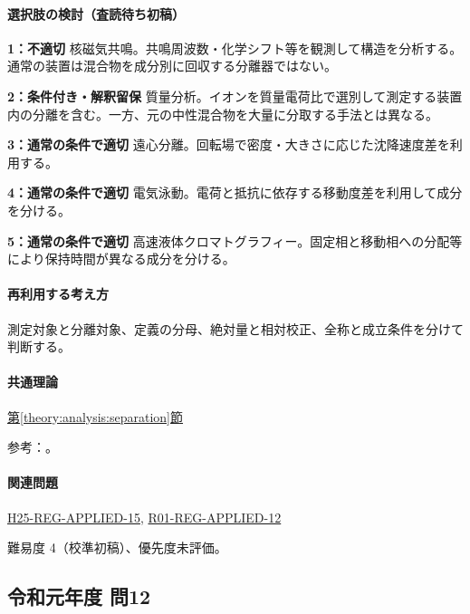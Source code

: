 \paragraph{選択肢の検討（査読待ち初稿）}\mbox{}\par

\noindent\textbf{1：不適切} 核磁気共鳴。共鳴周波数・化学シフト等を観測して構造を分析する。通常の装置は混合物を成分別に回収する分離器ではない。\par

\noindent\textbf{2：条件付き・解釈留保} 質量分析。イオンを質量電荷比で選別して測定する装置内の分離を含む。一方、元の中性混合物を大量に分取する手法とは異なる。\par

\noindent\textbf{3：通常の条件で適切} 遠心分離。回転場で密度・大きさに応じた沈降速度差を利用する。\par

\noindent\textbf{4：通常の条件で適切} 電気泳動。電荷と抵抗に依存する移動度差を利用して成分を分ける。\par

\noindent\textbf{5：通常の条件で適切} 高速液体クロマトグラフィー。固定相と移動相への分配等により保持時間が異なる成分を分ける。\par

\paragraph{再利用する考え方} 測定対象と分離対象、定義の分母、絶対量と相対校正、全称と成立条件を分けて判断する。

\paragraph{共通理論} \hyperref[theory:analysis:separation]{第\ref*{theory:analysis:separation}節}

\par 参考：\cite{analysis49_ms_ref}。

\paragraph{関連問題} \hyperref[q:h25-reg-applied-15]{H25-REG-APPLIED-15}, \hyperref[q:r01-reg-applied-12]{R01-REG-APPLIED-12}

\par 難易度 4（校準初稿）、優先度未評価。

\subsection{令和元年度 問12}
\label{q:r01-reg-applied-12}

